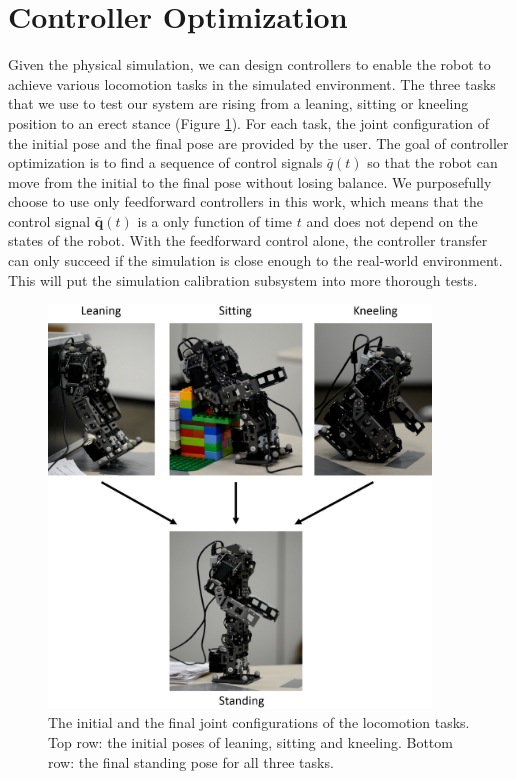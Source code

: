 \section{Controller Optimization}

Given the physical simulation, we can design controllers to enable the robot to achieve various locomotion tasks in the simulated environment. The three tasks that we use to test our system are rising from a leaning, sitting or kneeling position to an erect stance (Figure \ref{fig:task}). For each task, the joint configuration of the initial pose and the final pose are provided by the user. The goal of controller optimization is to find a sequence of control signals $\bar{q}(t)$ so that the robot can move from the initial to the final pose without losing balance. We purposefully choose to use only feedforward controllers in this work, which means that the control signal $\bar{\mathbf{q}}(t)$ is a only function of time $t$ and does not depend on the states of the robot. With the feedforward control alone, the controller transfer can only succeed if the simulation is close enough to the real-world environment. This will put the simulation calibration subsystem into more thorough tests.

\begin{figure}[!t]
  \centering
  \includegraphics[width=4in]{figures/initialFinal}
  \caption{The initial and the final joint configurations of the locomotion tasks. Top row: the initial poses of leaning, sitting and kneeling. Bottom row: the final standing pose for all three tasks.}
  \label{fig:task}
\end{figure}



